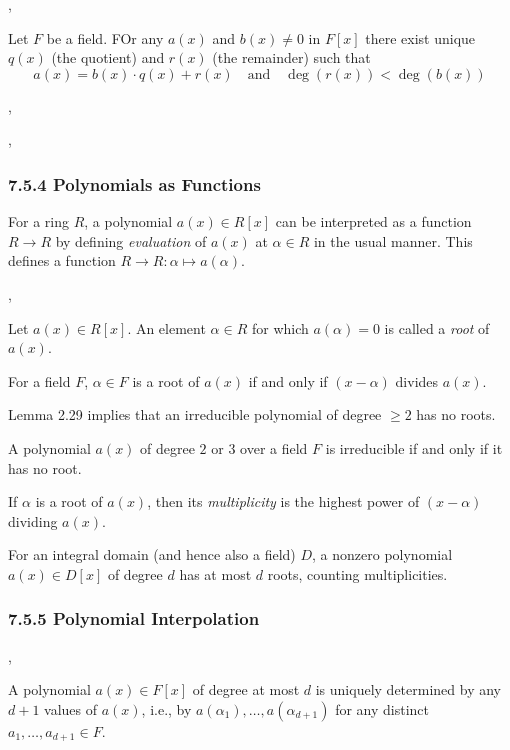 \sep

 Let $F$ be a field. FOr any $a(x)$ and $b(x)\neq 0$ in $F[x]$ there
exist unique $q(x)$ (the quotient) and $r(x)$ (the remainder) such that
\[
a(x)=b(x)\cdot q(x) + r(x) \quad \text{and} \quad \deg(r(x)) < \deg(b(x))
\]

\sep


\sep

\subsubsection*{7.5.4 Polynomials as Functions}

For a ring $R$, a polynomial $a(x)\in R[x]$ can be interpreted as a function
$R\to R$ by defining \emph{evaluation} of $a(x)$ at $\alpha\in R$ in the usual
manner. This defines a function $R \to R \colon \alpha \mapsto a(\alpha)$.

\sep

 Let $a(x)\in R[x]$. An element $\alpha \in R$ for which $a(\alpha)=0$
is called a \emph{root} of $a(x)$.

 For a field $F$, $\alpha \in F$ is a root of $a(x)$ if and only if
$(x-\alpha)$ divides $a(x)$.

\Lem{*} Lemma 2.29 implies that an irreducible polynomial of degree $\geq 2	$
has no roots.

 A polynomial $a(x)$ of degree $2$ or $3$ over a field $F$ is
irreducible if and only if it has no root.


 If $\alpha$ is a root of $a(x)$, then its \emph{multiplicity} is the
highest power of $(x-\alpha)$ dividing $a(x)$.

 For an integral domain (and hence also a field) $D$, a nonzero
polynomial $a(x)\in D[x]$ of degree $d$ has at most $d$ roots, counting
multiplicities.


\subsubsection*{7.5.5 Polynomial Interpolation}

\sep

 A polynomial $a(x)\in F[x]$ of degree at most $d$
is uniquely determined by any $d+1$ values of $a(x)$, i.e., by
$a(\alpha_1),\ldots,a(\alpha_{d+1})$ for any distinct $a_1,\ldots,a_{d+1}\in F$.

